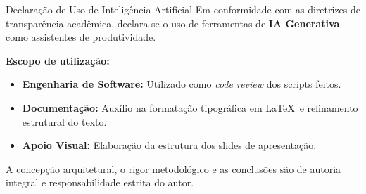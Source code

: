 \documentclass[aspectratio=169]{beamer}
\begin{document}
\begin{frame}{Declaração de Uso de Inteligência Artificial}
    \fontsize{8pt}{10pt}\selectfont
    Em conformidade com as diretrizes de transparência acadêmica, declara-se o uso de ferramentas de \textbf{IA Generativa} como assistentes de produtividade.

    \vspace{0.2cm}
    \textbf{Escopo de utilização:}
    \begin{itemize}
        \item \textbf{Engenharia de Software:} Utilizado como \textit{code review} dos scripts feitos.
        \item \textbf{Documentação:} Auxílio na formatação tipográfica em \LaTeX\ e refinamento estrutural do texto.
        \item \textbf{Apoio Visual:} Elaboração da estrutura dos slides de apresentação.
    \end{itemize}

    \vspace{0.3cm}
    \centering
    \fontsize{8pt}{10pt}\selectfont
    A concepção arquitetural, o rigor metodológico e as conclusões são de autoria integral e responsabilidade estrita do autor.
\end{frame}
\end{document}
